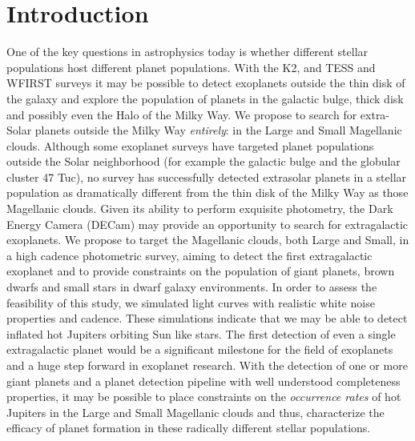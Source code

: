 \section{Introduction}

One of the key questions in astrophysics today is whether different stellar
populations host different planet populations.
With the K2, and TESS and WFIRST surveys it may be possible to detect
exoplanets outside the thin disk of the galaxy and explore the population of
planets in the galactic bulge, thick disk and possibly even the Halo of the
Milky Way.
We propose to search for extra-Solar planets outside the Milky Way {\it
entirely}: in the Large and Small Magellanic clouds.
Although some exoplanet surveys have targeted planet populations outside the
Solar neighborhood (for example the galactic bulge and the globular cluster 47
Tuc), no survey has successfully detected extrasolar planets in a stellar
population as dramatically different from the thin disk of the Milky Way as
those Magellanic clouds.
Given its ability to perform exquisite photometry, the Dark Energy Camera
(DECam) may provide an opportunity to search for extragalactic exoplanets.
We propose to target the Magellanic clouds, both Large and Small, in a high
cadence photometric survey, aiming to detect the first extragalactic exoplanet
and to provide constraints on the population of giant planets, brown dwarfs
and small stars in dwarf galaxy environments.
In order to assess the feasibility of this study, we simulated light curves
with realistic white noise properties and cadence.
These simulations indicate that we may be able to detect inflated hot Jupiters
orbiting Sun like stars.
The first detection of even a single extragalactic planet would be a
significant milestone for the field of exoplanets and a huge step forward in
exoplanet research.
With the detection of one or more giant planets and a planet detection
pipeline with well understood completeness properties, it may be possible to
place constraints on the {\it occurrence rates} of hot Jupiters in the Large
and Small Magellanic clouds and thus, characterize the efficacy of planet
formation in these radically different stellar populations.
